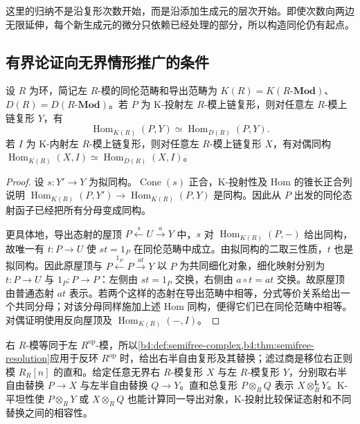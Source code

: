 这里的归纳不是沿复形次数开始，而是沿添加生成元的层次开始。即使次数向两边无限延伸，每个新生成元的微分只依赖已经处理的部分，所以构造同伦仍有起点。

\subsection{有界论证向无界情形推广的条件}
\label{b4:subsec:1804:03}

\begin{proposition}\label{b4:prop:k-resolution-comparison}
	设 \(R\) 为环，简记左 \(R\)-模的同伦范畴和导出范畴为 \(K(R)=K(R\text{-}\mathbf{Mod})\)、\(D(R)=D(R\text{-}\mathbf{Mod})\)。若 \(P\) 为 K-投射左 \(R\)-模上链复形，则对任意左 \(R\)-模上链复形 \(Y\)，有
	\[
		\operatorname{Hom}_{K(R)}(P,Y)\simeq\operatorname{Hom}_{D(R)}(P,Y).
	\]
	若 \(I\) 为 K-内射左 \(R\)-模上链复形，则对任意左 \(R\)-模上链复形 \(X\)，有对偶同构 \(\operatorname{Hom}_{K(R)}(X,I)\simeq\operatorname{Hom}_{D(R)}(X,I)\)。
\end{proposition}
\begin{proof}
	设 \(s:Y'\to Y\) 为拟同构。\(\operatorname{Cone}(s)\) 正合，K-投射性及 Hom 的锥长正合列说明 \(\operatorname{Hom}_{K(R)}(P,Y')\to\operatorname{Hom}_{K(R)}(P,Y)\) 是同构。因此从 \(P\) 出发的同伦态射函子已经把所有分母变成同构。

	更具体地，导出态射的屋顶 \(P\xleftarrow{s}U\xrightarrow{a}Y\) 中，\(s\) 对 \(\operatorname{Hom}_{K(R)}(P,-)\) 给出同构，故唯一有 \(t:P\to U\) 使 \(st=1_P\) 在同伦范畴中成立。由拟同构的二取三性质，\(t\) 也是拟同构。因此原屋顶与 \(P\xleftarrow{1_P}P\xrightarrow{at}Y\) 以 \(P\) 为共同细化对象，细化映射分别为 \(t:P\to U\) 与 \(1_P:P\to P\)：左侧由 \(st=1_P\) 交换，右侧由 \(a\circ t=at\) 交换。故原屋顶由普通态射 \(at\) 表示。若两个这样的态射在导出范畴中相等，分式等价关系给出一个共同分母；对该分母同样施加上述 Hom 同构，便得它们已在同伦范畴中相等。对偶证明使用反向屋顶及 \(\operatorname{Hom}_{K(R)}(-,I)\)。
\end{proof}

右 \(R\)-模等同于左 \(R^{\mathrm{op}}\)-模，所以\cref{b4:def:semifree-complex,b4:thm:semifree-resolution}应用于反环 \(R^{\mathrm{op}}\) 时，给出右半自由复形及其替换；滤过商是移位右正则模 \(R_R[n]\) 的直和。给定任意无界右 \(R\)-模复形 \(X\) 与左 \(R\)-模复形 \(Y\)，分别取右半自由替换 \(P\to X\) 与左半自由替换 \(Q\to Y\)。直和总复形 \(P\otimes_RQ\) 表示 \(X\otimes_R^{\mathbf L}Y\)。K-平坦性使 \(P\otimes_RY\) 或 \(X\otimes_RQ\) 也能计算同一导出对象，K-投射比较保证态射和不同替换之间的相容性。

